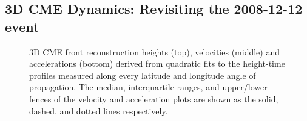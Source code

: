 \documentclass[preprint2]{aastex}
\begin{document}
\subsection{3D CME Dynamics: Revisiting the 2008-12-12 event}

\begin{figure}[!hp]
\caption{3D CME front reconstruction heights (top), velocities (middle) and accelerations (bottom) derived from quadratic fits to the height-time profiles measured along every latitude and longitude angle of propagation. The median, interquartile ranges, and upper/lower fences of the velocity and acceleration plots are shown as the solid, dashed, and dotted lines respectively.}
\label{kins_inspect}
\end{figure}
\end{document}
